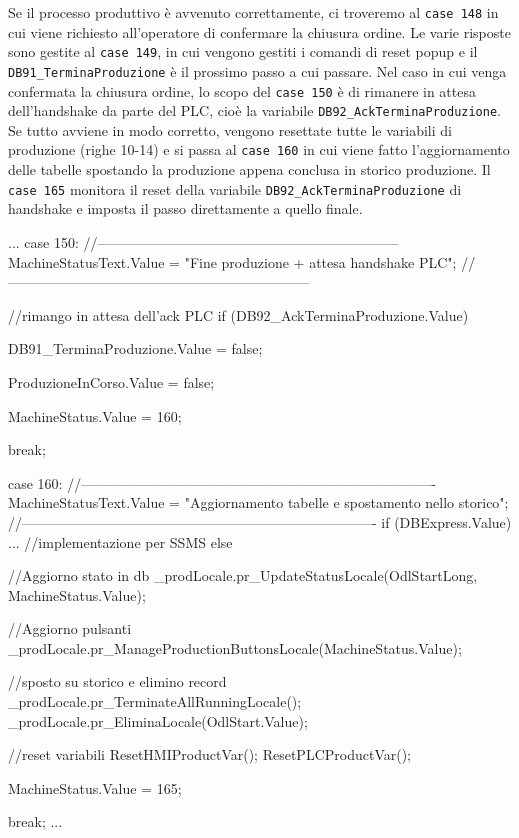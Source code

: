 Se il processo produttivo è avvenuto correttamente, ci troveremo al \verb|case 148| in cui viene richiesto all'operatore di confermare la chiusura ordine. Le varie risposte sono gestite al \verb|case 149|, in cui vengono gestiti i comandi di reset popup e il \verb|DB91_TerminaProduzione| è il prossimo passo a cui passare. Nel caso in cui venga confermata la chiusura ordine, lo scopo del \verb|case 150| è di rimanere in attesa dell'handshake da parte del PLC, cioè la variabile \verb|DB92_AckTerminaProduzione|. Se tutto avviene in modo corretto, vengono resettate tutte le variabili di produzione (righe 10-14) e si passa al \verb|case 160| in cui viene fatto l'aggiornamento delle tabelle spostando la produzione appena conclusa in storico produzione. Il \verb|case 165| monitora il reset della variabile \verb|DB92_AckTerminaProduzione| di handshake e imposta il passo direttamente a quello finale. 
\begin{csharp}
...
    case 150:
    //-----------------------------------------------------------------
    MachineStatusText.Value = "Fine produzione + attesa handshake PLC";
    //-----------------------------------------------------------------

    //rimango in attesa dell'ack PLC
    if (DB92_AckTerminaProduzione.Value)
    {
        DB91_TerminaProduzione.Value = false;

        ProduzioneInCorso.Value = false;

        MachineStatus.Value = 160;
    }

    break;

    case 160:
    //----------------------------------------------------------------------------
    MachineStatusText.Value = "Aggiornamento tabelle e spostamento nello storico";
    //----------------------------------------------------------------------------
    if (DBExpress.Value) {
        ... //implementazione per SSMS
    }
    else
    {
        //Aggiorno stato in db
        _prodLocale.pr_UpdateStatusLocale(OdlStartLong, MachineStatus.Value);

        //Aggiorno pulsanti
        _prodLocale.pr_ManageProductionButtonsLocale(MachineStatus.Value);

        //sposto su storico e elimino record
        _prodLocale.pr_TerminateAllRunningLocale();
        _prodLocale.pr_EliminaLocale(OdlStart.Value);

        //reset variabili
        ResetHMIProductVar();
        ResetPLCProductVar();

        MachineStatus.Value = 165;
    }
    
    break;
...
\end{csharp}
